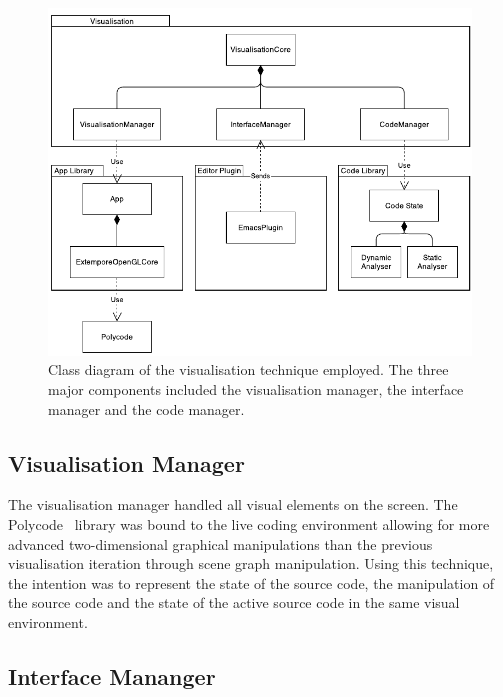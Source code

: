 
\begin{figure}
  \centering \includegraphics[width=\columnwidth]{../images/diagrams/visualisation-class-diagram.pdf}
  \caption[Prototype (second iteration) class diagram]{Class diagram of the visualisation technique employed. The three major components included the visualisation manager, the interface manager and the code manager.}
\label{fig:visualisation-class-diagram}
\end{figure}

\subsection{Visualisation Manager}

The visualisation manager handled all visual elements on the screen. The Polycode~\cite{Safrin2013} library was bound to the live coding environment allowing for more advanced two-dimensional graphical manipulations than the previous visualisation iteration through scene graph manipulation. Using this technique, the intention was to represent the state of the source code, the manipulation of the source code and the state of the active source code in the same visual environment.

\subsection{Interface Mananger}
\label{sec:interface-manager}

